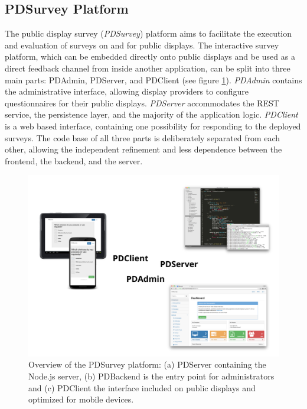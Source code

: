 

\subsection{PDSurvey Platform}

	The public display survey (\textit{PDSurvey}) platform aims to facilitate the execution and evaluation of surveys on and for public displays. 
	The interactive survey platform, which can be embedded directly onto public displays and be used as a direct feedback channel from inside another application, can be split into three main parts: PDAdmin, PDServer, and PDClient (see figure \ref{fig:4-pdsurvey-platform}). \textit{PDAdmin} contains the administrative interface, allowing display providers to configure questionnaires for their public displays. \textit{PDServer} accommodates the REST service, the persistence layer, and the majority of the application logic. \textit{PDClient} is a web based interface, containing one possibility for responding to the deployed surveys. 
	The code base of all three parts is deliberately separated from each other, allowing the independent refinement and less dependence between the frontend, the backend, and the server.

	\begin{figure}[btph]
	    \begin{center}
	        \includegraphics[width=.7\columnwidth]{img/screenshots/pdsurvey-overview/pdsurvey-platform.png}
	    \end{center}
	 \caption[Overview of the PDSurvey platform]{Overview of the PDSurvey platform: (a) PDServer containing the Node.js server, (b) PDBackend is the entry point for administrators and (c) PDClient the interface included on public displays and optimized for mobile devices.}
	 \label{fig:4-pdsurvey-platform}
	\end{figure}



